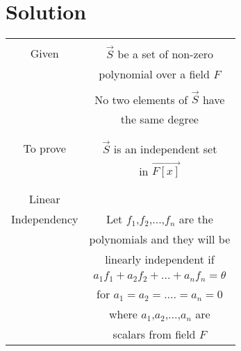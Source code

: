 \documentclass[journal,12pt,twocolumn]{IEEEtran}
\begin{document}
\section{Solution}
\begin{table}[h!]
\begin{center}
\begin{tabular}{|c|c|}
\hline
& \\
Given & $\vec{S}$ be a set of non-zero\\
& polynomial over a field $F$\\
& \\
& No two elements of $\vec{S}$ have\\
& the same degree\\
& \\
\hline
& \\
To prove & $\vec{S}$ is an independent set\\
& in $\vec{F[x]}$\\
& \\
\hline
& \\
Linear &\\
Independency  & Let $f_1$,$f_2$,...,$f_n$ are the\\
& polynomials and they will be \\
& linearly independent if\\
& $a_1f_1+a_2f_2+...+a_nf_n=\theta$ \\
& for $a_1=a_2=....=a_n=0$ \\
& where $a_1$,$a_2$,...,$a_n$ are \\
& scalars from field $F$\\
\hline
\end{tabular}
\end{center}
\end{table}
\end{document}
